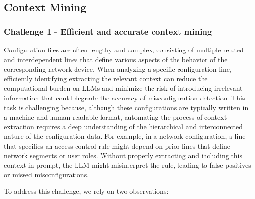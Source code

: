 \subsection{Context Mining}\label{mining_method} \subsubsection{Challenge 1 -
Efficient and accurate context mining} \label{challenge_1} Configuration files
are often lengthy and complex, consisting of multiple related and
interdependent lines that define various aspects of the behavior of the
corresponding network device. When
analyzing a specific configuration line, efficiently identifying
extracting the relevant context can reduce the computational burden on LLMs
and minimize the risk of introducing irrelevant information that could degrade
the accuracy of misconfiguration detection. This task is challenging because,
although these configurations are typically written in a machine and
human-readable format, automating the process of context extraction requires a
deep understanding of the hierarchical and interconnected nature of the
configuration data. For example, in a network configuration, a line that
specifies an access control rule might depend on prior lines that define
network segments or user roles. Without properly extracting and including this
context in prompt, the LLM might misinterpret the rule, leading to false
positives or missed misconfigurations.

To address this challenge, we rely on two observations:

